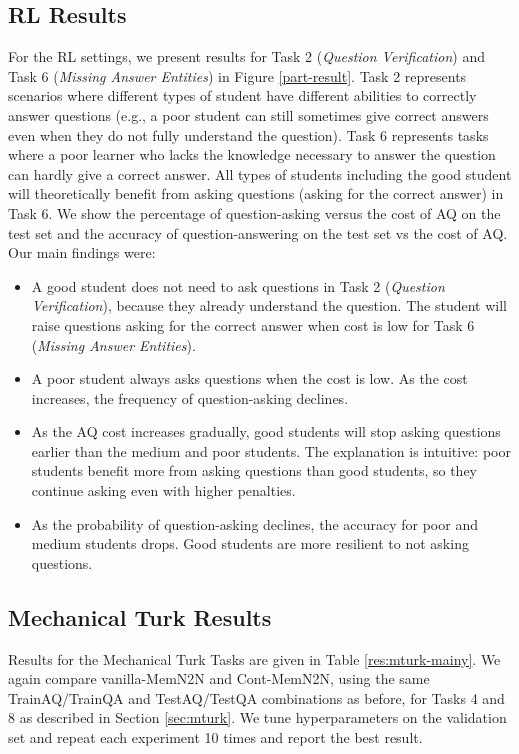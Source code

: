 \subsection{RL Results}
For the RL settings,
we  present  results for Task 2  ({\it Question Verification})
  and Task 6 ({\it Missing Answer Entities}) in Figure \ref{part-result}.
Task 2 represents scenarios where different types of student have different
abilities to correctly answer  questions (e.g., a poor student can still sometimes give
correct answers even when they do not fully understand the question).
Task 6 represents tasks where a poor learner who lacks the knowledge necessary
to answer the question can hardly give a correct answer.
All types of students including the good student will theoretically benefit from asking questions
(asking for the correct answer) in Task 6.
    We show the percentage of question-asking versus the cost of AQ on the test set
and  the accuracy of question-answering on the test set
vs the cost of AQ. Our main findings were: %
\begin{itemize}
\item
A good student does not need to ask questions
in Task 2  ({\it Question Verification}),
because they already understand the question. The student will raise questions
asking for the correct answer when cost is low for Task 6 ({\it Missing Answer Entities}).
\item A poor student always asks questions when the cost is low.
 As the cost increases, the frequency of question-asking declines.
\item As the AQ cost increases gradually, good students will stop asking questions
earlier than the medium and poor students. The explanation is intuitive:
poor students benefit more from asking questions than good students, so they
continue asking even with higher penalties.
\item As the probability of question-asking declines, the accuracy for poor and
medium students drops.  Good students are more resilient to not asking questions.
\end{itemize}

\subsection{Mechanical Turk Results} \label{sec:res-mturker}
Results for the Mechanical Turk Tasks are given in Table \ref{res:mturk-mainy}.
We again compare vanilla-MemN2N and Cont-MemN2N, using the same
 TrainAQ/TrainQA and TestAQ/TestQA combinations as before, 
for Tasks 4 and 8 as described in  Section \ref{sec:mturk}.
We tune hyperparameters on the validation set and 
repeat each experiment 10 times and report the best result. 

